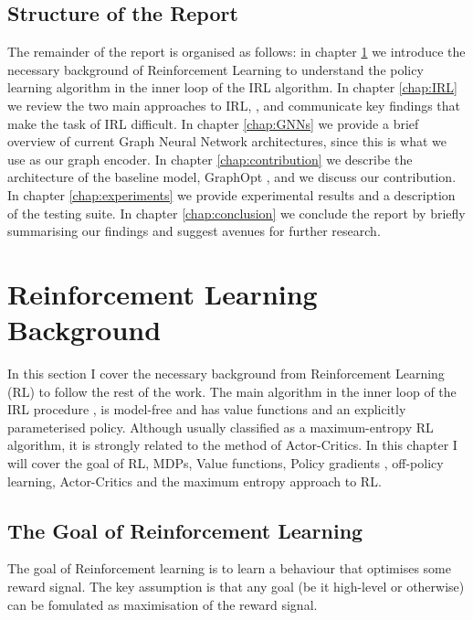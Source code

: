 \documentclass{report}
\numberwithin{equation}{section}
\numberwithin{figure}{section}
\numberwithin{table}{section}
\numberwithin{algorithm}{section}
\begin{document}
\section*{Structure of the Report}\label{sec:structureOfReport}
The remainder of the report is organised as follows:
in chapter \ref{chap:RL} we introduce the necessary background 
of Reinforcement Learning to understand the policy learning 
algorithm in the inner loop of the IRL algorithm. In chapter 
\ref{chap:IRL} we review the two main approaches to IRL, 
\citep{NgIRL,Ziebart2008}, and communicate key findings that 
make the task of IRL difficult. In chapter \ref{chap:GNNs} 
we provide a brief overview of current Graph Neural Network 
architectures, since this is what we use as our graph encoder.
In chapter \ref{chap:contribution} we describe the architecture 
of the baseline model, GraphOpt \citep{GraphOpt}, and we 
discuss our contribution. In chapter \ref{chap:experiments} we 
provide experimental results and a description of the testing 
suite. In chapter \ref{chap:conclusion} we conclude the 
report by briefly summarising our findings and suggest avenues 
for further research.


\chapter{Reinforcement Learning Background}
\label{chap:RL}
In this section I cover the necessary background from Reinforcement 
Learning (RL) to follow the 
rest of the work. The main algorithm in the inner 
loop of the IRL procedure \citep{SAC2}, is model-free and has value 
functions and an explicitly parameterised policy. Although usually 
classified as a maximum-entropy RL algorithm, it is strongly related 
to the method of Actor-Critics. In this chapter I will cover 
the goal of RL, 
MDPs, Value functions, Policy gradients \citep{REINFORCE}, 
off-policy learning, Actor-Critics \citep{Tsitsiklis} and 
the maximum entropy approach to RL.

\section{The Goal of Reinforcement Learning}
\label{sec:RLGoal}

The goal of Reinforcement learning is to learn a behaviour that 
optimises some reward signal. The key assumption is that 
any goal (be it high-level or otherwise) can be fomulated as 
maximisation of the reward signal.
\end{document}
